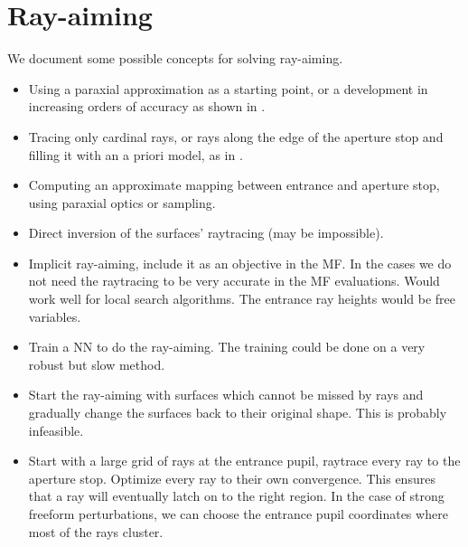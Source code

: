 \section{Ray-aiming}
We document some possible concepts for solving ray-aiming.

\begin{itemize}
\item Using a paraxial approximation as a starting point, or a development
      in increasing orders of accuracy as shown in \cite{Zheng2010}.
\item Tracing only cardinal rays, or rays along the edge of the aperture
      stop and filling it with an a priori model, as in \cite{Houllier-thesis}.
\item Computing an approximate mapping between entrance and aperture stop,
      using paraxial optics or sampling.
\item Direct inversion of the surfaces' raytracing (may be impossible).
\item Implicit ray-aiming, include it as an objective in the MF. In the
      cases we do not need the raytracing to be very accurate in the MF
      evaluations. Would work well for local search algorithms. The
      entrance ray heights would be free variables.
\item Train a NN to do the ray-aiming. The training could be done on
      a very robust but slow method.
\item Start the ray-aiming with surfaces which cannot be missed by rays
      and gradually change the surfaces back to their original shape.
      This is probably infeasible.
\item Start with a large grid of rays at the entrance pupil, raytrace every ray
      to the aperture stop. Optimize every ray to their own convergence.
      This ensures that a ray will eventually latch on to the right region.
      In the case of strong freeform perturbations, we can choose the entrance
      pupil coordinates where most of the rays cluster.
\end{itemize}
